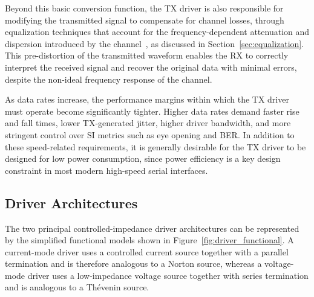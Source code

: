Beyond this basic conversion function, the \ac{TX} driver is also responsible for modifying the transmitted signal to compensate for channel losses, through equalization techniques that account for the frequency-dependent attenuation and dispersion introduced by the channel~\cite{chen_cml_review_2026,zamir2018_nrz_pam4}, as discussed in Section~\ref{sec:equalization}. This pre-distortion of the transmitted waveform enables the \ac{RX} to correctly interpret the received signal and recover the original data with minimal errors, despite the non-ideal frequency response of the channel.

As data rates increase, the performance margins within which the \ac{TX} driver must operate become significantly tighter. Higher data rates demand faster rise and fall times, lower \ac{TX}-generated jitter, higher driver bandwidth, and more stringent control over \ac{SI} metrics such as eye opening and \ac{BER}. In addition to these speed-related requirements, it is generally desirable for the \ac{TX} driver to be designed for low power consumption, since power efficiency is a key design constraint in most modern high-speed serial interfaces.

\subsection{Driver Architectures} \label{sec:tx_driver_architectures}


The two principal controlled-impedance driver architectures can be represented by the simplified functional models shown in Figure~\ref{fig:driver_functional}. A current-mode driver uses a controlled current source together with a parallel termination and is therefore analogous to a Norton source, whereas a voltage-mode driver uses a low-impedance voltage source together with series termination and is analogous to a Thévenin source.



